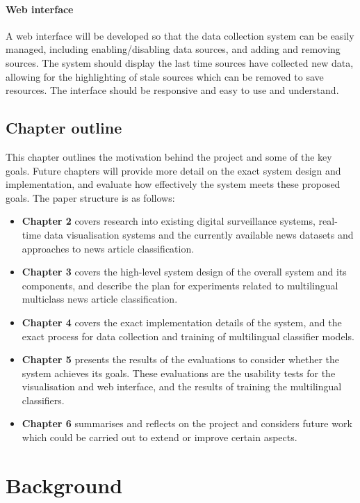 \documentclass{l4proj}
\begin{document}
\subsubsection{Web interface} A web interface will be developed so that the data collection system can be easily managed, including enabling/disabling data sources, and adding and removing sources. The system should display the last time sources have collected new data, allowing for the highlighting of stale sources which can be removed to save resources. The interface should be responsive and easy to use and understand.

\section{Chapter outline}
This chapter outlines the motivation behind the project and some of the key goals. Future chapters will provide more detail on the exact system design and implementation, and evaluate how effectively the system meets these proposed goals. The paper structure is as follows:
\begin{itemize}
\item \textbf{Chapter 2} covers research into existing digital surveillance systems, real-time data visualisation systems and the currently available news datasets and approaches to news article classification. 
\item \textbf{Chapter 3} covers the high-level system design of the overall system and its components, and describe the plan for experiments related to multilingual multiclass news article classification.
\item \textbf{Chapter 4} covers the exact implementation details of the system, and the exact process for data collection and training of multilingual classifier models.
\item \textbf{Chapter 5} presents the results of the evaluations to consider whether the system achieves its goals. These evaluations are the usability tests for the visualisation and web interface, and the results of training the multilingual classifiers.
\item \textbf{Chapter 6} summarises and reflects on the project and considers future work which could be carried out to extend or improve certain aspects.
\end{itemize}

\chapter{Background}
\end{document}
